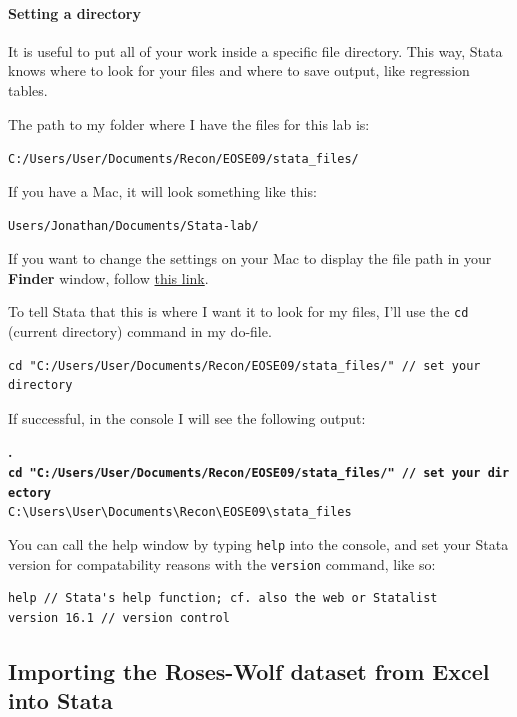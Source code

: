 \documentclass[
  letterpaper,
  DIV=11,
  numbers=noendperiod]{scrartcl}
\let\oldparagraph\paragraph
\renewcommand{\paragraph}[1]{\oldparagraph{#1}\mbox{}}
\begin{document}
\hypertarget{setting-a-directory}{%
\paragraph{Setting a directory}\label{setting-a-directory}}

It is useful to put all of your work inside a specific file directory.
This way, Stata knows where to look for your files and where to save
output, like regression tables.

The path to my folder where I have the files for this lab is:

\texttt{C:/Users/User/Documents/Recon/EOSE09/stata\_files/}

If you have a Mac, it will look something like this:

\texttt{Users/Jonathan/Documents/Stata-lab/}

If you want to change the settings on your Mac to display the file path
in your \textbf{Finder} window, follow
\href{https://www.lifewire.com/use-macs-hidden-finder-path-bar-2260868}{this
link}.

To tell Stata that this is where I want it to look for my files, I'll
use the \texttt{cd} (current directory) command in my do-file.

\begin{verbatim}
cd "C:/Users/User/Documents/Recon/EOSE09/stata_files/" // set your directory
\end{verbatim}

If successful, in the console I will see the following output:

\textbf{.
\texttt{cd\ "C:/Users/User/Documents/Recon/EOSE09/stata\_files/"\ //\ set\ your\ directory}}\\
\hspace*{0.333em}\hspace*{0.333em}\texttt{C:\textbackslash{}Users\textbackslash{}User\textbackslash{}Documents\textbackslash{}Recon\textbackslash{}EOSE09\textbackslash{}stata\_files}

You can call the help window by typing \texttt{help} into the console,
and set your Stata version for compatability reasons with the
\texttt{version} command, like so:

\begin{verbatim}
help // Stata's help function; cf. also the web or Statalist
version 16.1 // version control
\end{verbatim}

\hypertarget{importing-the-roses-wolf-dataset-from-excel-into-stata}{%
\subsection{Importing the Roses-Wolf dataset from Excel into
Stata}\label{importing-the-roses-wolf-dataset-from-excel-into-stata}}
\end{document}

